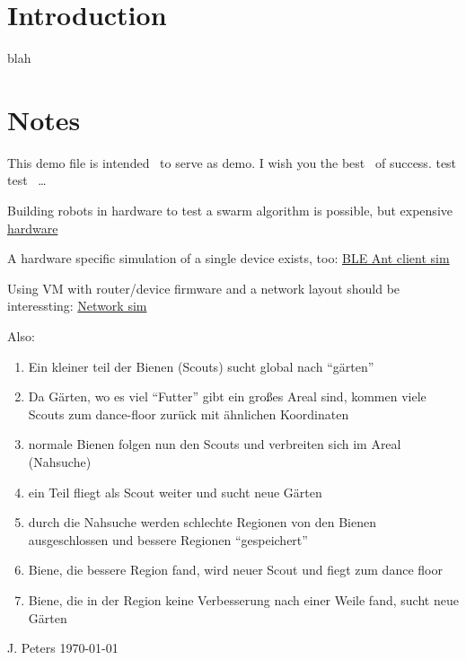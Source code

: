 \section{Introduction}\label{introduction}

blah

\section{Notes}\label{notes}

This demo file is intended~\cite{Tentschert2000} to serve as demo. I wish
you the best~\cite{li2014chaos} of success. test
test~\cite{gonzalez2017smells} \ldots{}

Building robots in hardware to test a swarm algorithm is possible, but
expensive
\href{https://en.wikipedia.org/wiki/Swarm_robotic_platforms}{hardware}

A hardware specific simulation of a single device exists, too:
\href{https://infocenter.nordicsemi.com/index.jsp?topic=\%2Fcom.nordic.infocenter.sdk52.v0.9.0\%2Fant_examples_ant_fs.html}{BLE
Ant client sim}

Using VM with router/device firmware and a network layout should be
interessting: \href{https://www.gns3.com/community}{Network sim}

Also:

\begin{enumerate}
\def\labelenumi{\arabic{enumi}.}
\tightlist
\item
  Ein kleiner teil der Bienen (Scouts) sucht global nach ``gärten''
\item
  Da Gärten, wo es viel ``Futter'' gibt ein großes Areal sind, kommen
  viele Scouts zum dance-floor zurück mit ähnlichen Koordinaten
\item
  normale Bienen folgen nun den Scouts und verbreiten sich im Areal
  (Nahsuche)
\item
  ein Teil fliegt als Scout weiter und sucht neue Gärten
\item
  durch die Nahsuche werden schlechte Regionen von den Bienen
  ausgeschlossen und bessere Regionen ``gespeichert''
\item
  Biene, die bessere Region fand, wird neuer Scout und fiegt zum dance
  floor
\item
  Biene, die in der Region keine Verbesserung nach einer Weile fand,
  sucht neue Gärten
\end{enumerate}

\hfill J. Peters \hfill \today

